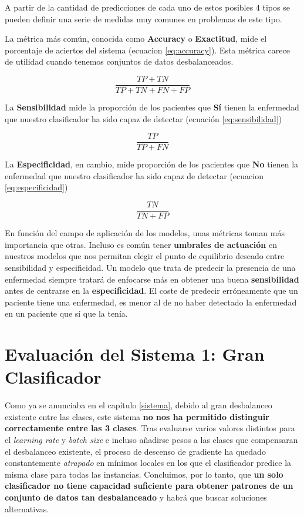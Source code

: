 \documentclass[
  12pt,
  spanish,
  a4paperpaper,
]{report}
\begin{document}
A partir de la cantidad de predicciones de cada uno de estos posibles 4
tipos se pueden definir una serie de medidas muy comunes en problemas de
este tipo.

La métrica más común, conocida como \textbf{Accuracy} o
\textbf{Exactitud}, mide el porcentaje de aciertos del sistema (ecuacion
\ref{eq:accuracy}). Esta métrica carece de utilidad cuando tenemos
conjuntos de datos desbalanceados.

\begin{equation} \label{eq:accuracy}
 \frac{TP+TN}{TP+TN+FN+FP}
\end{equation}

La \textbf{Sensibilidad} mide la proporción de los pacientes que
\textbf{Sí} tienen la enfermedad que nuestro clasificador ha sido capaz
de detectar (ecuación \ref{eq:sensibilidad})

\begin{equation} \label{eq:sensibilidad}
 \frac{TP}{TP+FN}
\end{equation}

La \textbf{Especificidad}, en cambio, mide proporción de los pacientes
que \textbf{No} tienen la enfermedad que nuestro clasificador ha sido
capaz de detectar (ecuacion \ref{eq:especificidad})

\begin{equation} \label{eq:especificidad}
 \frac{TN}{TN+FP}
\end{equation}

En función del campo de aplicación de los modelos, unas métricas toman
más importancia que otras. Incluso es común tener \textbf{umbrales de
actuación} en nuestros modelos que nos permitan elegir el punto de
equilibrio deseado entre sensibilidad y especificidad. Un modelo que
trata de predecir la presencia de una enfermedad siempre tratará de
enfocarse más en obtener una buena \textbf{sensibilidad} antes de
centrarse en la \textbf{especificidad}. El coste de predecir
erróneamente que un paciente tiene una enfermedad, es menor al de no
haber detectado la enfermedad en un paciente que sí que la tenía.

\hypertarget{evaluaciuxf3n-del-sistema-1-gran-clasificador}{%
\section{Evaluación del Sistema 1: Gran
Clasificador}\label{evaluaciuxf3n-del-sistema-1-gran-clasificador}}

Como ya se anunciaba en el capítulo \ref{sistema}, debido al gran
desbalanceo existente entre las clases, este sistema \textbf{no nos ha
permitido distinguir correctamente entre las 3 clases}. Tras evaluarse
varios valores distintos para el \emph{learning rate} y \emph{batch
size} e incluso añadirse pesos a las clases que compensaran el
desbalanceo existente, el proceso de descenso de gradiente ha quedado
constantemente \emph{atrapado} en mínimos locales en los que el
clasificador predice la misma clase para todas las instancias.
Concluimos, por lo tanto, que \textbf{un solo clasificador no tiene
capacidad suficiente para obtener patrones de un conjunto de datos tan
desbalanceado} y habrá que buscar soluciones alternativas.
\end{document}
